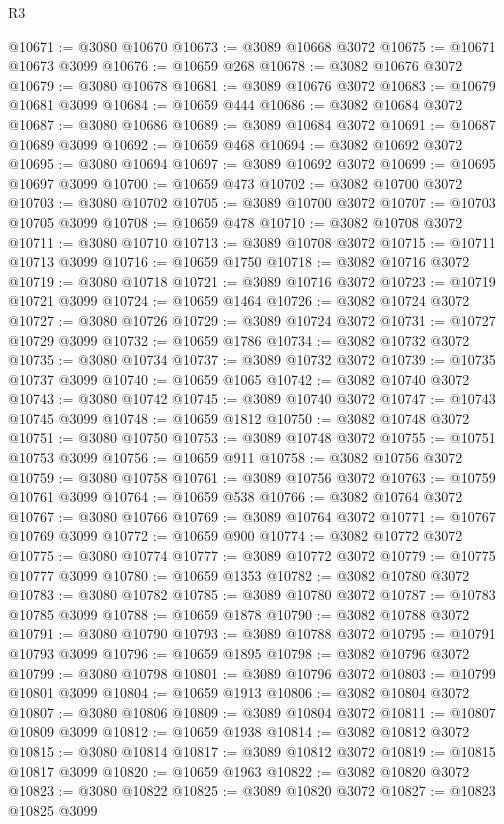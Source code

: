 \begin{lexlean}{R3}
\begin{coremodule}
@10671 := @3080 @10670
@10673 := @3089 @10668 @3072
@10675 := @10671 @10673 @3099
@10676 := @10659 @268
@10678 := @3082 @10676 @3072
@10679 := @3080 @10678
@10681 := @3089 @10676 @3072
@10683 := @10679 @10681 @3099
@10684 := @10659 @444
@10686 := @3082 @10684 @3072
@10687 := @3080 @10686
@10689 := @3089 @10684 @3072
@10691 := @10687 @10689 @3099
@10692 := @10659 @468
@10694 := @3082 @10692 @3072
@10695 := @3080 @10694
@10697 := @3089 @10692 @3072
@10699 := @10695 @10697 @3099
@10700 := @10659 @473
@10702 := @3082 @10700 @3072
@10703 := @3080 @10702
@10705 := @3089 @10700 @3072
@10707 := @10703 @10705 @3099
@10708 := @10659 @478
@10710 := @3082 @10708 @3072
@10711 := @3080 @10710
@10713 := @3089 @10708 @3072
@10715 := @10711 @10713 @3099
@10716 := @10659 @1750
@10718 := @3082 @10716 @3072
@10719 := @3080 @10718
@10721 := @3089 @10716 @3072
@10723 := @10719 @10721 @3099
@10724 := @10659 @1464
@10726 := @3082 @10724 @3072
@10727 := @3080 @10726
@10729 := @3089 @10724 @3072
@10731 := @10727 @10729 @3099
@10732 := @10659 @1786
@10734 := @3082 @10732 @3072
@10735 := @3080 @10734
@10737 := @3089 @10732 @3072
@10739 := @10735 @10737 @3099
@10740 := @10659 @1065
@10742 := @3082 @10740 @3072
@10743 := @3080 @10742
@10745 := @3089 @10740 @3072
@10747 := @10743 @10745 @3099
@10748 := @10659 @1812
@10750 := @3082 @10748 @3072
@10751 := @3080 @10750
@10753 := @3089 @10748 @3072
@10755 := @10751 @10753 @3099
@10756 := @10659 @911
@10758 := @3082 @10756 @3072
@10759 := @3080 @10758
@10761 := @3089 @10756 @3072
@10763 := @10759 @10761 @3099
@10764 := @10659 @538
@10766 := @3082 @10764 @3072
@10767 := @3080 @10766
@10769 := @3089 @10764 @3072
@10771 := @10767 @10769 @3099
@10772 := @10659 @900
@10774 := @3082 @10772 @3072
@10775 := @3080 @10774
@10777 := @3089 @10772 @3072
@10779 := @10775 @10777 @3099
@10780 := @10659 @1353
@10782 := @3082 @10780 @3072
@10783 := @3080 @10782
@10785 := @3089 @10780 @3072
@10787 := @10783 @10785 @3099
@10788 := @10659 @1878
@10790 := @3082 @10788 @3072
@10791 := @3080 @10790
@10793 := @3089 @10788 @3072
@10795 := @10791 @10793 @3099
@10796 := @10659 @1895
@10798 := @3082 @10796 @3072
@10799 := @3080 @10798
@10801 := @3089 @10796 @3072
@10803 := @10799 @10801 @3099
@10804 := @10659 @1913
@10806 := @3082 @10804 @3072
@10807 := @3080 @10806
@10809 := @3089 @10804 @3072
@10811 := @10807 @10809 @3099
@10812 := @10659 @1938
@10814 := @3082 @10812 @3072
@10815 := @3080 @10814
@10817 := @3089 @10812 @3072
@10819 := @10815 @10817 @3099
@10820 := @10659 @1963
@10822 := @3082 @10820 @3072
@10823 := @3080 @10822
@10825 := @3089 @10820 @3072
@10827 := @10823 @10825 @3099

\end{coremodule}
\end{lexlean}
